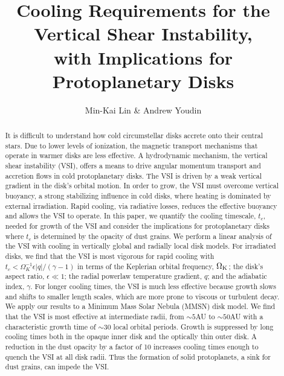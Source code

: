 \documentclass[iop]{emulateapj}
\def \OmK {\Omega_{\rm K}}
\begin{document}
\title{Cooling Requirements for the Vertical Shear Instability, \\
 with Implications for Protoplanetary Disks}
\author{Min-Kai Lin \& Andrew Youdin}

\begin{abstract}
  It is difficult to understand how cold circumstellar disks accrete onto their central stars.  Due to 
  lower levels of ionization, the magnetic transport mechanisms that operate in warmer disks are less effective. 
  A hydrodynamic mechanism, the vertical shear instability (VSI), offers a means to drive angular momentum 
  transport and accretion flows in cold protoplanetary disks.  
  The VSI is driven by a weak vertical gradient in the disk's orbital motion.
  In order to grow, the VSI must overcome vertical buoyancy, a strong stabilizing influence in cold disks, where 
  heating is dominated by external irradiation.  Rapid cooling, via radiative losses, reduces the effective buoyancy
  and allows the VSI to operate.  In this paper, we quantify the cooling timescale, $t_c$, needed for growth of the VSI
  and consider the implications for protoplanetary disks where $t_c$ is determined by the opacity of dust 
  grains.  We perform a linear analysis of the VSI with cooling in vertically global and radially local disk models.
  For irradiated disks, we find that the VSI is most vigorous for rapid cooling with $t_c < \Omega_K^{-1} \epsilon |q| / (\gamma -1)$
  in terms of the Keplerian orbital frequency, $\OmK$; the disk's aspect ratio, $\epsilon \ll 1$; the radial 
  powerlaw temperature gradient, $q$; and the adiabatic index, $\gamma$.  For longer cooling times, the VSI 
  is much less effective because growth slows and shifts to smaller length scales, which are more prone to 
  viscous or turbulent decay.  We apply our results to a  Minimum Mass Solar Nebula (MMSN) disk model.  We
  find that the VSI is most effective at intermediate radii, from $\sim 5$AU to $\sim 50$AU with a
  characteristic growth time of $\sim 30$ local orbital periods.  Growth is suppressed by long cooling times both in the opaque 
  inner disk and the optically thin outer disk.  A reduction in the dust opacity by a factor of 10 increases cooling times 
  enough to quench the VSI at all disk radii.  Thus the formation of solid protoplanets, a sink for dust grains, can impede the VSI.


\end{abstract}
\end{document}
